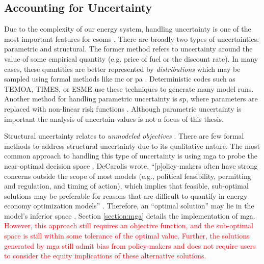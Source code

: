 \subsection{Accounting for Uncertainty}
\label{section:uncertainty}
Due to the complexity of our energy system, handling uncertainty is one of the
most important features for \acp{esom} \cite{yue_review_2018,
decarolis_using_2011}. There are broadly two types of uncertainties: parametric
and structural. The former method refers to uncertainty around the value of some
empirical quantity (e.g. price of fuel or the discount rate). In many cases,
these quantities are better represented by \textit{distributions} which may be
sampled using formal methods like \ac{mc} or \ac{pa}
\cite{pfenninger_energy_2014, yue_review_2018}. Deterministic codes such as
TEMOA, TIMES, or ESME use these techniques to generate many model runs. Another
method for handling parametric uncertainty is \ac{sp}, where parameters are
replaced with non-linear risk functions \cite{yue_review_2018,
decarolis_multi-stage_2012}. Although parametric uncertainty is important the
analysis of uncertain values is not a focus of this thesis.

Structural uncertainty relates to \textit{unmodeled objectives}
\cite{yue_review_2018, decarolis_using_2011, decarolis_modelling_2016}. There
are few formal methods to address structural uncertainty due to its qualitative
nature. The most common approach to handling this type of uncertainty is using
\ac{mga} to probe the near-optimal decision space \cite{brill_mga_1990,
jenkins_genx_2022, decarolis_using_2011, neumann_near-optimal_2021,
pfenninger_energy_2014}. DeCarolis wrote, ``[p]olicy-makers often have strong
concerns outside the scope of most models (e.g., political feasibility,
permitting and regulation, and timing of action), which implies that feasible,
sub-optimal solutions may be preferable for reasons that are difficult to
quantify in energy economy optimization models'' \cite{decarolis_using_2011}.
Therefore, an ``optimal solution'' may lie in the model's inferior space
\cite{decarolis_using_2011}. Section \ref{section:mga} details the
implementation of \ac{mga}. \textcolor{red}{However, this approach still requires an
objective function, and the sub-optimal space is still within some tolerance of the 
optimal value. Further, the solutions generated by \ac{mga} still admit bias from
policy-makers and does not require users to consider the equity implications of these
alternative solutions.} 

